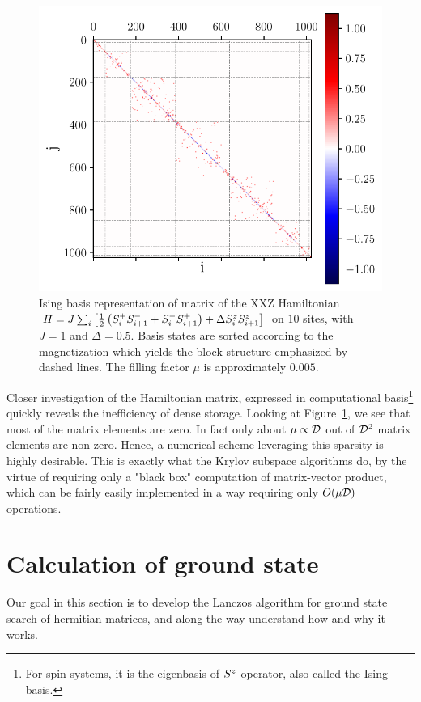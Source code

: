 \begin{figure}[htbp]
	\centering
	\includegraphics[width=0.7\linewidth]{Figures/matrix_elements.pdf}
	\caption{Ising basis representation of matrix of the XXZ Hamiltonian \(H = J\sum_{i} \left[\frac{1}{2}\left(S^{+}_i S^{-}_{i+1} +
	 S^{-}_{i}S^{+}_{i+1}\right) + \Delta S^{z}_i S^{z}_{i+1}\right]\) on \(10\) sites, with \(J = 1\) and \(\Delta=0.5\).
	Basis states are sorted according to the magnetization which yields the block structure emphasized by dashed lines.
	The filling factor \(\mu\) is approximately \(0.005\).}
	\label{fig:sparse_structure}
\end{figure}

 Closer investigation of the Hamiltonian matrix, expressed in computational basis\footnote{For spin systems, it is the eigenbasis of \(S^{z}\) operator, also called the Ising basis.}
 quickly reveals the inefficiency of dense storage. Looking at Figure~\ref{fig:sparse_structure}, we see that most of
 the matrix elements are zero. In fact only about \(\mu \propto \mathcal{D} \) out of \(\mathcal{D}^2\) matrix elements
 are non-zero. Hence, a numerical scheme leveraging this sparsity is highly desirable. This is exactly what the Krylov subspace algorithms
 do, by the virtue of requiring only a "black box" computation of matrix-vector product, which can be fairly easily implemented in a way
 requiring only \(O(\mu \mathcal{D})\) operations.

\section{Calculation of ground state}
Our goal in this section is to develop the Lanczos algorithm for ground state search of hermitian matrices, and along
the way understand how and why it works.

